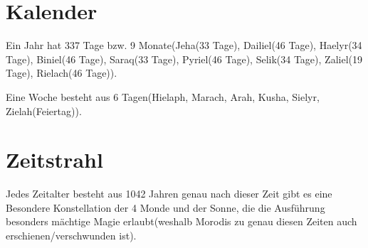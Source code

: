 \section{Kalender}
Ein Jahr hat 337 Tage bzw. 9 Monate(Jeha(33 Tage), Dailiel(46 Tage), Haelyr(34 Tage), Biniel(46 Tage), Saraq(33 Tage), Pyriel(46 Tage), Selik(34 Tage), Zaliel(19 Tage), Rielach(46 Tage)).

Eine Woche besteht aus 6 Tagen(Hielaph, Marach, Arah, Kusha, Sielyr, Zielah(Feiertag)).

\section{Zeitstrahl}
Jedes Zeitalter besteht aus 1042 Jahren genau nach dieser Zeit gibt es eine Besondere Konstellation der 4 Monde und der Sonne, die die Ausführung besonders mächtige Magie erlaubt(weshalb Morodis zu genau diesen Zeiten auch erschienen/verschwunden ist).
